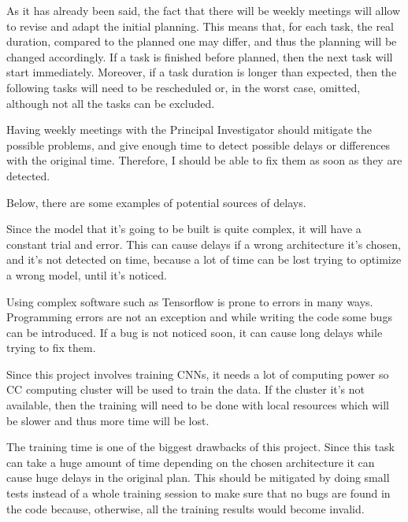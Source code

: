 
As it has already been said, the fact that there will be weekly meetings will allow to 
revise and adapt the initial planning. This means that, for each task, the real duration, 
compared to the planned one may differ, and thus the planning will be changed accordingly. 
If a task is finished before planned, then the next task will start immediately. 
Moreover, if a task duration is longer than expected, then the following tasks will need 
to be rescheduled or, in the worst case, omitted, although not all the tasks can be excluded.

Having weekly meetings with the Principal Investigator should mitigate the possible problems,
and give enough time to detect possible delays or differences with the original time. Therefore,
I should be able to fix them as soon as they are detected.

Below, there are some examples of potential sources of delays.


Since the model that it's going to be built is quite complex, it will have a constant trial
and error. This can cause delays if a wrong architecture it's chosen, and it's not detected
on time, because a lot of time can be lost trying to optimize a wrong model,
until it's noticed. 


Using complex software such as Tensorflow is prone to errors in many ways. Programming errors
are not an exception and while writing the code some bugs can be introduced. If a bug is not 
noticed soon, it can cause long delays while trying to fix them.


Since this project involves training \glspl{CNN}, it needs a lot of computing 
power so \gls{CC} computing cluster will be used to train the data. If the cluster it's not available,
then the training will need to be done with local resources which will be slower and thus 
more time will be lost.


The training time is one of the biggest drawbacks of this project. Since this task
can take a huge amount of time depending on the chosen architecture it can cause
huge delays in the original plan. This should be mitigated by doing small tests
instead of a whole training session to make sure that no bugs are found in the code 
because, otherwise, all the training results would become invalid.

